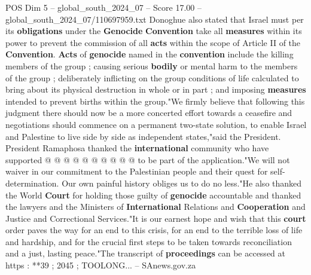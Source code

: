 \begin{textsample}{POS Dim 5 – global\_south\_2024\_07 – Score 17.00 – global\_south\_2024\_07/110697959.txt}
Donoghue also stated that Israel must per its \textbf{obligations} under the \textbf{Genocide} \textbf{Convention} take all \textbf{measures} within its power to prevent the commission of all \textbf{acts} within the scope of Article II of the \textbf{Convention}. \textbf{Acts} of \textbf{genocide} named in the \textbf{convention} include the killing members of the group ; causing serious \textbf{bodily} or mental harm to the members of the group ; deliberately inflicting on the group conditions of life calculated to bring about its physical destruction in whole or in part ; and imposing \textbf{measures} intended to prevent births within the group."We firmly believe that following this judgment there should now be a more concerted effort towards a ceasefire and negotiations should commence on a permanent two-state solution, to enable Israel and Palestine to live side by side as independent states,"said the President.
President Ramaphosa thanked the \textbf{international} community who have supported @ @ @ @ @ @ @ @ @ @ to be part of the application."We will not waiver in our commitment to the Palestinian people and their quest for self-determination.
Our own painful history obliges us to do no less."He also thanked the World \textbf{Court} for holding those guilty of \textbf{genocide} accountable and thanked the lawyers and the Ministers of \textbf{International} Relations and \textbf{Cooperation} and Justice and Correctional Services."It is our earnest hope and wish that this \textbf{court} order paves the way for an end to this crisis, for an end to the terrible loss of life and hardship, and for the crucial first steps to be taken towards reconciliation and a just, lasting peace."The transcript of \textbf{proceedings} can be accessed at https : **39 ; 2045 ; TOOLONG... -- SAnews.gov.za

\end{textsample}
